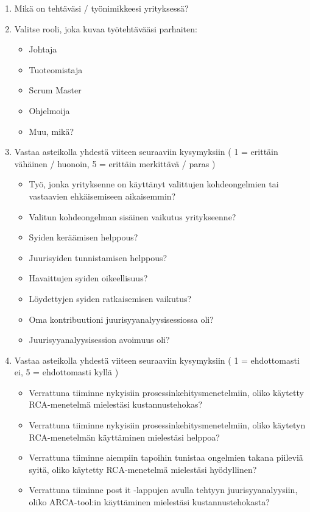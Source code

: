 \begin{enumerate}
  \item Mikä on tehtäväsi / työnimikkeesi yrityksessä?
  \item Valitse rooli, joka kuvaa työtehtävääsi parhaiten:
  \begin{itemize}
	\item Johtaja
	\item Tuoteomistaja
	\item Scrum Master
	\item Ohjelmoija
	\item Muu, mikä?
  \end{itemize}
  \item Vastaa asteikolla yhdestä viiteen seuraaviin kysymyksiin ( 1 = erittäin vähäinen / huonoin, 5 = erittäin merkittävä / paras )
   \begin{itemize}
	\item Työ, jonka yrityksenne on käyttänyt valittujen kohdeongelmien tai vastaavien ehkäisemiseen aikaisemmin?
	\item Valitun kohdeongelman sisäinen vaikutus yritykseenne?
	\item Syiden keräämisen helppous?
	\item Juurisyiden tunnistamisen helppous?
	\item Havaittujen syiden oikeellisuus?
	\item Löydettyjen syiden ratkaisemisen vaikutus?
	\item Oma kontribuutioni juurisyyanalyysisessiossa oli?
	\item Juurisyyanalyysisession avoimuus oli?
   \end{itemize}
  \item Vastaa asteikolla yhdestä viiteen seuraaviin kysymyksiin ( 1 = ehdottomasti ei, 5 = ehdottomasti kyllä )
  \begin{itemize}
	\item Verrattuna tiiminne nykyisiin prosessinkehitysmenetelmiin, oliko käytetty RCA-menetelmä mielestäsi kustannustehokas?
	\item Verrattuna tiiminne nykyisiin prosessinkehitysmenetelmiin, oliko käytetyn RCA-menetelmän käyttäminen mielestäsi helppoa?
	\item Verrattuna tiiminne aiempiin tapoihin tunistaa ongelmien takana piileviä syitä, oliko käytetty RCA-menetelmä mielestäsi hyödyllinen?
	\item Verrattuna tiiminne post it -lappujen avulla tehtyyn juurisyyanalyysiin, oliko ARCA-tool:in käyttäminen mielestäsi kustannustehokasta?

\end{itemize}
\end{enumerate}
